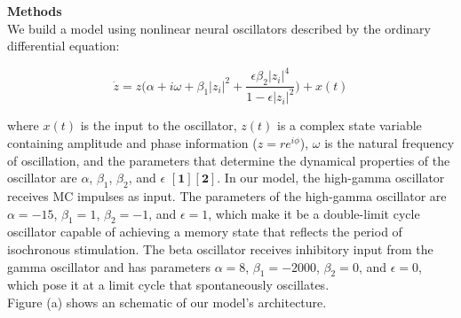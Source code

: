\documentclass[12pt]{article}
\begin{document}

{\bf Methods}\\
\noindent
We build a model using nonlinear neural oscillators described by the ordinary differential equation: 

\begin{equation}
\dot{z} = z\bigg( \alpha + i\omega +\beta_1|z_i|^2+\frac{\epsilon\beta_2|z_i|^4}{1-\epsilon|z_i|^2}\bigg) + x(t)
\end{equation}


where $x(t)$ is the input to the oscillator, $z(t)$ is a complex state variable containing amplitude and phase information ($z = re^{i\phi}$), $\omega$ is the natural frequency of oscillation, and the parameters that determine the dynamical properties of the oscillator are $\alpha$, $\beta_1$, $\beta_2$, and $\epsilon$ 
$\mathbf{[1]}\mathbf{[2]}$.
In our model, the high-gamma oscillator receives MC impulses as input. The parameters of the high-gamma oscillator are $\alpha = -15$, $\beta_1 = 1$, $\beta_2 = -1$, and $\epsilon = 1$, which make it be a double-limit cycle oscillator capable of achieving a memory state that reflects the period of isochronous stimulation. The beta oscillator receives inhibitory input from the gamma oscillator and has parameters $\alpha = 8$, $\beta_1 = -2000$, $\beta_2 = 0$, and $\epsilon = 0$, which pose it at a limit cycle that spontaneously oscillates. \\Figure (a) shows an schematic of our model's architecture.


\end{document}

